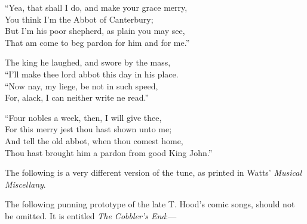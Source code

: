 \begin{dcverse}\footnotesizerr
“Yea, that shall I do, and make your grace merry,\\
You think I’m the Abbot of Canterbury; \\
But I’m his poor shepherd, as plain you may see,\\
That am come to beg pardon for him and for me.”

The king he laughed, and swore by the mass,\\
“I’ll make thee lord abbot this day in his place.\\
\columnbreak
“Now nay, my liege, be not in such speed,\\
For, alack, I can neither write ne read.”

“Four nobles a week, then, I will give thee,\\
For this merry jest thou hast shown unto me;\\
And tell the old abbot, when thou comest home,\\
Thou hast brought him a pardon from good King John.”
\end{dcverse}

The following is a very different version of the tune, as printed in Watts’
\textit{Musical Miscellany}.


\medskip


The following punning prototype of the late T. Hood’s comic songs, should not
be omitted. It is entitled \textit{The Cobbler's End}:—


